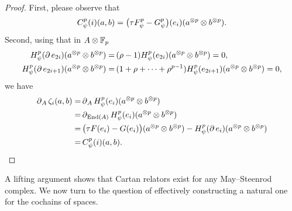 \begin{proof}
	First, please observe that
	\[
	C^p_\psi(i)(a,b) =
	\big(\tau F_\psi^p - G_\psi^p\big)(e_i)(a^{\otimes p} \otimes b^{\otimes p}).
	\]
	Second, using that in $A \otimes {\mathbb{F}_p}$
	\begin{align*}
		H_\psi^p(\operatorname{\partial} e_{2i})(a^{\otimes p} \otimes b^{\otimes p}) =&\,
		(\rho - 1) H_\psi^p(e_{2i})(a^{\otimes p} \otimes b^{\otimes p}) = 0, \\
		H_\psi^p(\operatorname{\partial} e_{2i+1})(a^{\otimes p} \otimes b^{\otimes p}) =&\,
		(1+\rho+\dots+\rho^{p-1}) H_\psi^p(e_{2i+1})(a^{\otimes p} \otimes b^{\otimes p}) = 0,
	\end{align*}
	we have
	\begin{align*}
		\operatorname{\partial}_A \zeta_i(a,b) =&
		\operatorname{\partial}_A H_\psi^p(e_i)(a^{\otimes p} \otimes b^{\otimes p}) \\ =&
		\operatorname{\partial}_{\mathrm{End}(A)} H_\psi^p(e_i)(a^{\otimes p} \otimes b^{\otimes p}) \\ =& \,
		\big(\tau F(e_i) - G(e_i)\big)(a^{\otimes p} \otimes b^{\otimes p}) -
		H_\psi^p(\operatorname{\partial} e_i)(a^{\otimes p} \otimes b^{\otimes p}) \\ =&\,
		C^p_\psi(i)(a,b).\qedhere
	\end{align*}
\end{proof}

A lifting argument shows that Cartan relators exist for any May--Steenrod complex.
We now turn to the question of effectively constructing a natural one for the cochains of spaces.